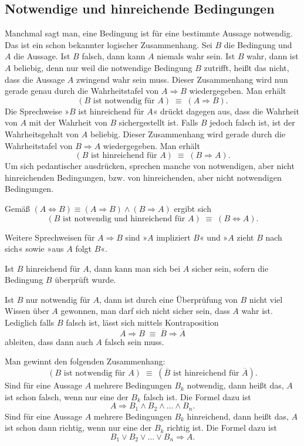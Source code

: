 \newpage
\subsection{Notwendige und hinreichende Bedingungen}

Manchmal sagt man, eine Bedingung ist für eine bestimmte Aussage
notwendig. Das ist ein schon bekannter logischer Zusammenhang.
Sei $B$ die Bedingung und $A$ die Aussage. Ist $B$ falsch, dann
kann $A$ niemals wahr sein. Ist $B$ wahr, dann ist $A$ beliebig,
denn nur weil die notwendige Bedingung $B$ zutrifft, heißt das nicht,
dass die Aussage $A$ zwingend wahr sein muss. Dieser Zusammenhang
wird nun gerade genau durch die Wahrheitstafel von $A\Rightarrow B$
wiedergegeben. Man erhält%
\[(\text{$B$ ist notwendig für $A$})\;\equiv\; (A\Rightarrow B).\]
Die Sprechweise »$B$ ist hinreichend für $A$« drückt dagegen aus,
dass die Wahrheit von $A$ mit der Wahrheit von $B$ sichergestellt
ist. Falls $B$ jedoch falsch ist, ist der Wahrheitsgehalt von $A$
beliebig. Dieser Zusammenhang wird gerade durch die Wahrheitstafel
von $B\Rightarrow A$ wiedergegeben. Man erhält%
\[(\text{$B$ ist hinreichend für $A$})\;\equiv\; (B\Rightarrow A).\]
Um sich pedantischer ausdrücken, sprechen manche von notwendigen,
aber nicht hinreichenden Bedingungen, bzw. von hinreichenden,
aber nicht notwendigen Bedingungen. 

Gemäß
$(A\Leftrightarrow B)\equiv (A\Rightarrow B)\land (B\Rightarrow A)$
ergibt sich
\[(\text{$B$ ist notwendig und hinreichend für $A$})\;\equiv\;(B\Leftrightarrow A).\]

\noindent
Weitere Sprechweisen für $A\Rightarrow B$ sind »$A$ impliziert $B$«
und »$A$ zieht $B$ nach sich« sowie »aus $A$ folgt $B$«.

Ist $B$ hinreichend für $A$, dann kann man sich bei $A$ sicher sein,
sofern die Bedingung $B$ überprüft wurde.

Ist $B$ nur notwendig für $A$, dann ist durch eine Überprüfung von $B$
nicht viel Wissen über $A$ gewonnen, man darf sich nicht sicher sein,
dass $A$ wahr ist. Lediglich falls $B$ falsch
ist, lässt sich mittels Kontraposition%
\[A\Rightarrow B\;\equiv\;\overline B\Rightarrow\overline A\]
ableiten, dass dann auch $A$ falsch sein muss.

Man gewinnt den folgenden Zusammenhang:
\[(\text{$B$ ist notwendig für $A$})\;\equiv\;
(\text{$\overline B$ ist hinreichend für $\overline A$}).\]
Sind für eine Aussage $A$ mehrere Bedingungen $B_k$ notwendig,
dann heißt das, $A$ ist schon falsch, wenn nur eine der $B_k$
falsch ist. Die Formel dazu ist
\[A\Rightarrow B_1\land B_2\land\ldots\land B_n.\]
Sind für eine Aussage $A$ mehrere Bedingungen $B_k$ hinreichend,
dann heißt das, $A$ ist schon dann richtig, wenn nur eine der $B_k$
richtig ist. Die Formel dazu ist
\[B_1\lor B_2\lor\ldots\lor B_n\Rightarrow A.\]

